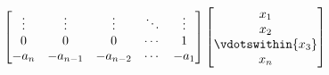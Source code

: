\documentclass{article}
\begin{document}
\begin{theorem}
\begin{equation*}
\begin{bmatrix}
            \vdots & \vdots   & \vdots   & \ddots & \vdots \\
            0      & 0        & 0        & \cdots & 1      \\
            -a_n   & -a_{n-1} & -a_{n-2} & \cdots & -a_1
        \end{bmatrix}
        \begin{bmatrix}
            x_1               \\
            x_2               \\
            \vdotswithin{x_3} \\
            x_n
        \end{bmatrix}
    \end{equation*}
\end{theorem}
\end{document}
